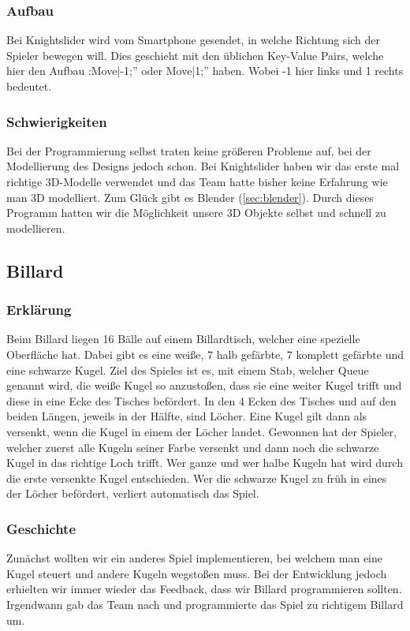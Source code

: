 \subsubsection{Aufbau}
Bei Knightslider wird vom Smartphone gesendet, in welche Richtung sich der Spieler bewegen will. Dies geschieht mit den üblichen Key-Value Pairs, welche hier den Aufbau :Move|-1;” oder Move|1;” haben. Wobei -1 hier links und 1 rechts bedeutet.
\subsubsection{Schwierigkeiten}
Bei der Programmierung selbst traten keine größeren Probleme auf, bei der Modellierung des Designs jedoch schon. Bei Knightslider haben wir das erste mal richtige 3D-Modelle verwendet und das Team hatte bisher keine Erfahrung wie man 3D modelliert. Zum Glück gibt es Blender (\ref{sec:blender}). Durch dieses Programm hatten wir die Möglichkeit unsere 3D Objekte selbst und schnell zu modellieren.
\subsection{Billard}
\subsubsection{Erklärung}
Beim Billard liegen 16 Bälle auf einem Billardtisch, welcher eine spezielle Oberfläche hat. Dabei gibt es eine weiße, 7 halb gefärbte, 7 komplett gefärbte und eine schwarze Kugel. Ziel des Spieles ist es, mit einem Stab, welcher Queue genannt wird, die weiße Kugel so anzustoßen, dass sie eine weiter Kugel trifft und diese in eine Ecke des Tisches befördert. In den 4 Ecken des Tisches und auf den beiden Längen, jeweils in der Hälfte, sind Löcher. Eine Kugel gilt dann als versenkt, wenn die Kugel in einem der Löcher landet. Gewonnen hat der Spieler, welcher zuerst alle Kugeln seiner Farbe versenkt und dann noch die schwarze Kugel in das richtige Loch trifft. Wer ganze und wer halbe Kugeln hat wird durch die erste versenkte Kugel entschieden. Wer die schwarze Kugel zu früh in eines der Löcher befördert, verliert automatisch das Spiel.
\subsubsection{Geschichte}
Zunächst wollten wir ein anderes Spiel implementieren, bei welchem man eine Kugel steuert und andere Kugeln wegstoßen muss. Bei der Entwicklung jedoch erhielten wir immer wieder das Feedback, dass wir Billard programmieren sollten. Irgendwann gab das Team nach und programmierte das Spiel zu richtigem Billard um.
